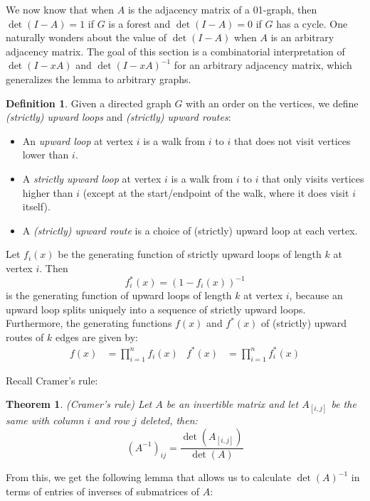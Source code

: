 \documentclass[a4paper, 11pt]{article}
\newtheorem{theorem}{Theorem}[section]
\theoremstyle{definition}
\newtheorem{definition}{Definition}[section]
\begin{document}
We now know that when $A$ is the adjacency matrix of a 01-graph, then $\det(I - A) = 1$ if $G$ is a forest and $\det(I - A) = 0$ if $G$ has a cycle. One naturally wonders about the value of $\det(I - A)$ when $A$ is an arbitrary adjacency matrix. The goal of this section is a combinatorial interpretation of $\det(I - xA)$ and $\det(I - xA)^{-1}$ for an arbitrary adjacency matrix, which generalizes the lemma to arbitrary graphs.

\begin{definition}
  Given a directed graph $G$ with an order on the vertices, we define \emph{(strictly) upward loops} and \emph{(strictly) upward routes}:
  \begin{itemize}
    \item An \emph{upward loop} at vertex $i$ is a walk from $i$ to $i$ that does not visit vertices lower than $i$.
    \item A \emph{strictly upward loop} at vertex $i$ is a walk from $i$ to $i$ that only visits vertices higher than $i$ (except at the start/endpoint of the walk, where it does visit $i$ itself).
    \item A \emph{(strictly) upward route} is a choice of (strictly) upward loop at each vertex.
  \end{itemize}
  Let $f_i(x)$ be the generating function of strictly upward loops of length $k$ at vertex $i$. Then \[ f^{*}_i(x) = (1 - f_i(x))^{-1} \] is the generating function of upward loops of length $k$ at vertex $i$, because an upward loop splits uniquely into a sequence of strictly upward loops. Furthermore, the generating functions $f(x)$ and $f^{*}(x)$ of (strictly) upward routes of $k$ edges are given by:
  \begin{align*}
    f(x) &= \prod_{i=1}^n f_i(x) &
    f^{*}(x) &= \prod_{i=1}^n f^{*}_i(x)
  \end{align*}
\end{definition}

Recall Cramer's rule:
\begin{theorem} (Cramer's rule)
  Let $A$ be an invertible matrix and let $A_{[i,j]}$ be the same with column $i$ and row $j$ deleted, then:
  \[ (A^{-1})_{ij} = \frac{\det(A_{[i,j]})}{\det(A)} \]
\end{theorem}

From this, we get the following lemma that allows us to calculate $\det(A)^{-1}$ in terms of entries of inverses of submatrices of $A$:
\end{document}
